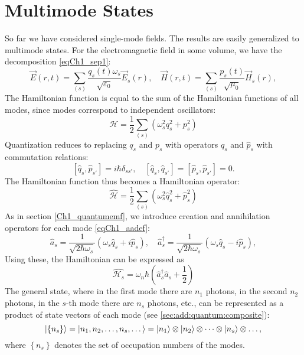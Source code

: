\section{Multimode States}
So far we have considered single-mode fields. The results are easily
generalized to multimode states. For the electromagnetic field in
some volume, we have the decomposition \eqref{eqCh1_sep1}:
\begin{equation}
\vec{E}\left(r, t\right) = \sum_{(s)}
\frac{q_s\left(t\right) \omega_s}{\sqrt{\varepsilon_0}} \vec{E}_s\left(r\right),
\quad
\vec{H}\left(r, t\right) = \sum_{(s)}
\frac{p_s\left(t\right)}{\sqrt{\mu_0}} \vec{H}_s\left(r\right),
\end{equation}
The Hamiltonian function is equal to the sum of the Hamiltonian functions of all modes, since
modes correspond to independent oscillators:
\begin{equation}
\mathcal{H} = \frac{1}{2} 
\sum_{(s)} \left(\omega_s^2 q_s^2 + p_s^2 \right)
\end{equation}
Quantization reduces to replacing $q_s$ and $p_s$ with operators $\hat{q}_s$
and $\hat{p}_s$ with commutation relations:
\begin{equation}
\left[\hat{q}_s, \hat{p}_{s'}\right] = i\hbar \delta_{ss'},
\quad 
\left[\hat{q}_s, \hat{q}_{s'}\right] = \left[\hat{p}_s,
  \hat{p}_{s'}\right] = 0.
\end{equation}
The Hamiltonian function thus becomes a Hamiltonian operator:
\begin{equation}
\hat{\mathcal{H}} = \frac{1}{2} \sum_{(s)} \left(\omega_s^2 \hat{q}_s^2 + \hat{p}_s^2 \right)
\end{equation}
As in section \ref{Ch1_quantumemf}, we introduce creation and
annihilation operators for each mode \eqref{eqCh1_aadef}:
\begin{equation}
\hat{a}_s = \frac{1}{\sqrt{2 \hbar \omega_s}}
\left( \omega_s \hat{q}_s + i \hat{p}_s\right),
\quad
\hat{a}_s^{\dag} = \frac{1}{\sqrt{2 \hbar \omega_s}}
\left( \omega_s \hat{q}_s - i \hat{p}_s\right),
\end{equation}
Using these, the Hamiltonian can be expressed as
\begin{equation}
\hat{\mathcal{H}_s} = \omega_n \hbar 
\left(\hat{a}_s^{\dag} \hat{a}_s + \frac{1}{2}\right)
\nonumber
\end{equation}
The general state, where in the first mode there are $n_1$ photons, in the second $n_2$
photons, in the $s$-th mode there are $n_s$ photons, etc., can be represented as
a product of state vectors of each mode (see
\autoref{sec:add:quantum:composite}):
\begin{equation}
\left|\left\{n_s\right\}\right> = 
\left|n_1, n_2, \dots, n_s, \dots\right> =
\ket{n_1} \otimes
\ket{n_2} \otimes
\dots
\otimes
\ket{n_s} \otimes
\dots, 
\nonumber
\end{equation}
where $\left\{n_s\right\}$ denotes the set of occupation numbers of the modes.

